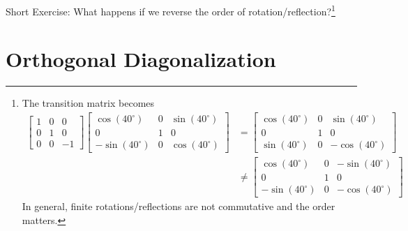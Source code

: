 Short Exercise: What happens if we reverse the order of rotation/reflection?\footnote{The transition matrix becomes
\begin{align*}
\begin{bmatrix}
1 & 0 & 0 \\
0 & 1 & 0 \\
0 & 0 & -1
\end{bmatrix}
\begin{bmatrix}
\cos(40^\circ) & 0 & \sin(40^\circ) \\
0 & 1 & 0 \\
-\sin(40^\circ) & 0 & \cos(40^\circ)
\end{bmatrix}
&=
\begin{bmatrix}
\cos(40^\circ) & 0 & \sin(40^\circ) \\
0 & 1 & 0 \\
\sin(40^\circ) & 0 & -\cos(40^\circ)
\end{bmatrix} \\
&\neq 
\begin{bmatrix}
\cos(40^\circ) & 0 & -\sin(40^\circ) \\
0 & 1 & 0 \\
-\sin(40^\circ) & 0 & -\cos(40^\circ)
\end{bmatrix}
\end{align*}
In general, finite rotations/reflections are not commutative and the order matters.
}

\section{Orthogonal Diagonalization}
\label{section:orthogonaldiagreal}

